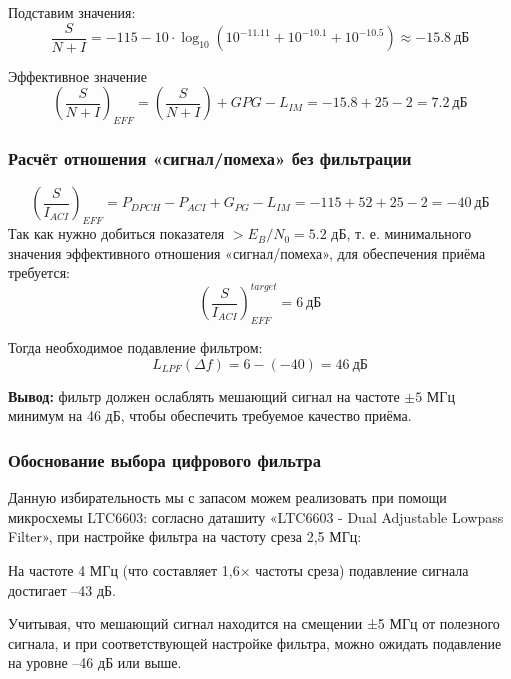 \documentclass[a4paper,12pt]{article}
\begin{document}
Подставим значения:
\begin{equation}
\frac{S}{N + I} = -115 - 10 \cdot \log_{10} \left(10^{-11.11} + 10^{-10.1} + 10^{-10.5} \right) \approx -15.8\ \text{дБ}
\end{equation}

Эффективное значение
\begin{equation}
\left( \frac{S}{N + I} \right)_{EFF} = \left( \frac{S}{N + I} \right) + G{PG} - L_{IM} = -15.8 + 25 - 2= 7.2\ \text{дБ}
\end{equation}


\subsubsection{Расчёт отношения «сигнал/помеха» без фильтрации}
\begin{equation}
\left( \frac{S}{I_{ACI}} \right)_{EFF} = P_{DPCH} - P_{ACI} + G_{PG} - L_{IM} = -115 + 52 + 25 - 2 = -40\ \text{дБ}
\end{equation}
Так как нужно добиться показателя $>E_B/N_0 =5.2$ дБ, т. е.  минимального значения эффективного отношения «сигнал/помеха», для обеспечения приёма требуется:
\begin{equation}
\left( \frac{S}{I_{ACI}} \right)_{EFF}^{target} = 6\ \text{дБ}
\end{equation}

Тогда необходимое подавление фильтром:
\begin{equation}
L_{LPF}(\Delta f) = 6 - (-40) = 46\ \text{дБ}
\end{equation}

\textbf{Вывод:} фильтр должен ослаблять мешающий сигнал на частоте $\pm5$ МГц минимум на 46 дБ, чтобы обеспечить требуемое качество приёма.  

\subsubsection{Обоснование выбора цифрового фильтра}
Данную избирательность мы с запасом можем реализовать при помощи микросхемы LTC6603: согласно  даташиту «LTC6603 - Dual Adjustable Lowpass Filter», при настройке фильтра на частоту среза 2,5 МГц:​

На частоте 4 МГц (что составляет 1,6× частоты среза) подавление сигнала достигает –43 дБ.​

Учитывая, что мешающий сигнал находится на смещении ±5 МГц от полезного сигнала, и при соответствующей настройке фильтра, можно ожидать подавление на уровне –46 дБ или выше.
\end{document}
